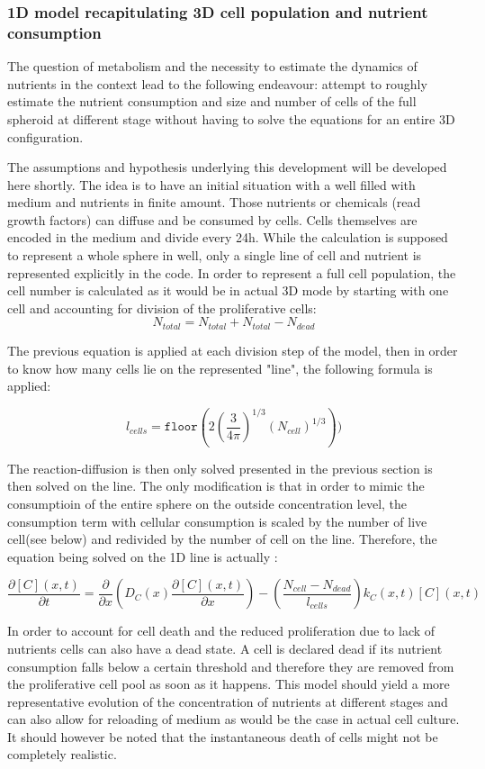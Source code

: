 \documentclass[11pt,a4paper]{article}
\begin{document}
\subsubsection{1D model recapitulating 3D cell population and nutrient consumption}
The question of metabolism and the necessity to estimate the dynamics of nutrients in the context lead to the following endeavour: attempt to roughly estimate the nutrient consumption and size and number of cells of the full spheroid at different stage without having to solve the equations for an entire 3D configuration.

The assumptions and hypothesis underlying this development will be developed here shortly. The idea is to have an initial situation with a well filled with medium and nutrients in finite amount. Those nutrients or chemicals (read growth factors) can diffuse and be consumed by cells. Cells themselves are encoded in the medium and divide every 24h. While the calculation is supposed to represent a whole sphere in well, only a single line of cell and nutrient is represented explicitly in the code. In order to represent a full cell population, the cell number is calculated as it would be in actual 3D mode by starting with one cell and accounting for division of the proliferative cells: 
\[N_{total} = N_{total} + N_{total} - N_{dead}\]

The previous equation is applied at each division step of the model, then in order to know how many cells lie on the represented "line", the following formula is applied: 

\[l_{cells} = \mathtt{floor}(2(\frac{3}{4\pi})^{1/3}(N_{cell})^{1/3})) \] 
   
The reaction-diffusion is then only solved presented in the previous section is then solved on the line. The only modification is that in order to mimic the consumptioin of the entire sphere on the outside concentration level, the consumption term with cellular consumption is scaled by the number of live cell(see below) and redivided by the number of cell on the line. Therefore, the equation being solved on the 1D line is actually :

\[ \frac{\partial [C](x,t)}{\partial t} = \frac{\partial }{\partial x}(D_C(x)\frac{\partial [C](x,t)}{\partial x}) -(\frac{N_{cell} - N_{dead}}{l_{cells}})k_C(x,t)[C](x,t) \]  


In order to account for cell death and the reduced proliferation due to lack of nutrients cells can also have a dead state. A cell is declared dead if its nutrient consumption falls below a certain threshold and therefore they are removed from the proliferative cell pool as soon as it happens. This model should yield a more representative evolution of the concentration of nutrients at different stages and can also allow for reloading of medium as would be the case in actual cell culture. It should however be noted that the instantaneous death of cells might not be completely realistic. 
\end{document}
